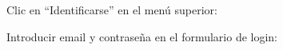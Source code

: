 \documentclass[12pt, spanish]{article}
\begin{document}
    \begin{steps}

        \item Clic en ``Identificarse'' en el menú superior:

            \medskip
            \begin{minipage}[t]{\linewidth}
            \raggedright
        \end{minipage}

        \item Introducir email y contraseña en el formulario de login:

            \medskip
            \begin{minipage}[t]{\linewidth}
            \raggedright
        \end{minipage}


\end{steps}
\end{document}
